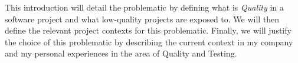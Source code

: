 This introduction will detail the problematic by defining what is
\textit{Quality} in a software project and what low-quality projects are
exposed to.
We will then define the relevant project contexts for this problematic.
Finally, we will justify the choice of this problematic by describing the
current context in my company and my personal experiences in the area of
Quality and Testing.






